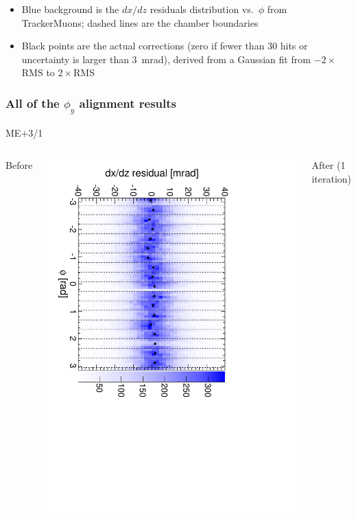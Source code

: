 \documentclass[compress]{beamer}
\begin{document}
\begin{frame}
\begin{itemize}
\item Blue background is the $dx/dz$ residuals distribution
  vs.\ $\phi$ from TrackerMuons; dashed lines are the chamber boundaries
\item Black points are the actual corrections (zero if fewer than 30
  hits or uncertainty is larger than 3~mrad), derived from a Gaussian
  fit from $-2\times$RMS to $2\times$RMS
\end{itemize}
\end{frame}

\begin{frame}
\frametitle{All of the $\phi_y$ alignment results}
\begin{center}
ME$+$3/1
\end{center}

\begin{columns}
\centering Before

\includegraphics[height=\linewidth, angle=90]{iter01_mep31.pdf}

\centering After (1 iteration)


\end{columns}
\end{frame}
\end{document}

